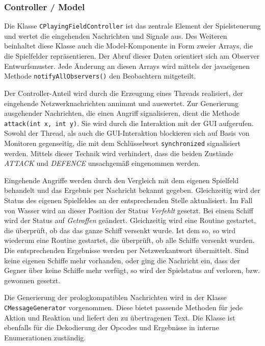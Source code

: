 \subsubsection{Controller / Model}

Die Klasse \texttt{CPlayingFieldController} ist das zentrale Element der Spielsteuerung und wertet die eingehenden Nachrichten und Signale aus.
Des Weiteren beinhaltet diese Klasse auch die Model-Komponente in Form zweier Arrays, die die Spielfelder repräsentieren.
Der Abruf dieser Daten orientiert sich am Observer Entwurfsmuster.
Jede Änderung an diesen Arrays wird mittels der javaeigenen Methode \texttt{notifyAllObservers()} den Beobachtern mitgeteilt.

Der Controller-Anteil wird durch die Erzeugung eines Threads realisiert, der eingehende Netzwerknachrichten annimmt und auswertet.
Zur Generierung ausgehender Nachrichten, die einen Angriff signalisieren, dient die Methode \texttt{attack(int x, int y)}. Sie wird durch die Interaktion mit der GUI aufgerufen.
Sowohl der Thread, als auch die GUI-Interaktion blockieren sich auf Basis von Monitoren gegenseitig, die mit dem Schlüsselwort \texttt{synchronized} signalisiert werden.
Mittels dieser Technik wird verhindert, dass die beiden Zustände \emph{ATTACK} und \emph{DEFENCE} unsachgemäß eingenommen werden.

Eingehende Angriffe werden durch den Vergleich mit dem eigenen Spielfeld behandelt und das Ergebnis per Nachricht bekannt gegeben.
Gleichzeitig wird der Status des eigenen Spielfeldes an der entsprechenden Stelle aktualisiert.
Im Fall von Wasser wird an dieser Position der Status \textit{Verfehlt} gesetzt.
Bei einem Schiff wird der Status auf \textit{Getroffen} geändert.
Gleichzeitig wird eine Routine gestartet, die überprüft, ob das das ganze Schiff versenkt wurde.
Ist dem so, so wird wiederum eine Routine gestartet, die überprüft, ob alle Schiffe versenkt wurden.
Die entsprechenden Ergebnisse werden per Netzwerkantwort übermittelt.
Sind keine eigenen Schiffe mehr vorhanden, oder ging die Nachricht ein, dass der Gegner über keine Schiffe mehr verfügt, so wird der Spielstatus auf verloren, bzw. gewonnen gesetzt.

Die Generierung der prologkompatiblen Nachrichten wird in der Klasse \texttt{CMes\-sage\-Ge\-ne\-ra\-tor} vorgenommen.
Diese bietet passende Methoden für jede Aktion und Reaktion und liefert den zu übertragenen Text.
Die Klasse ist ebenfalls für die Dekodierung der Opcodes und Ergebnisse in interne Enumerationen zuständig.

